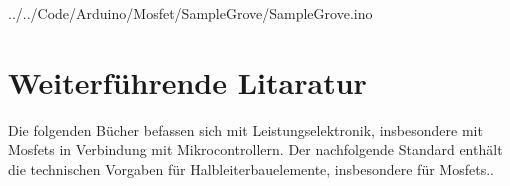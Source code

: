 \begin{code}
	\caption{Einfaches Testprogramm Für das Mosfet nach \cite{GroveMOSFETDocs}}
	\label{Code:Mosfet}
	\ArduinoExternal{}
	{../../Code/Arduino/Mosfet/SampleGrove/SampleGrove.ino}
\end{code}

\section{Weiterführende Litaratur} 

Die folgenden Bücher befassen sich mit Leistungselektronik, insbesondere mit Mosfets in Verbindung mit Mikrocontrollern. \cite{PowEl2017} \cite{ElPArd2022}
Der nachfolgende Standard enthält die technischen Vorgaben für Halbleiterbauelemente, insbesondere für Mosfets.. \cite{IEC60747}
